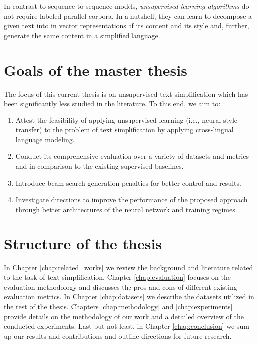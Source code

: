 In contrast to sequence-to-sequence models, \emph{unsupervised learning algorithms} do not require labeled parallel corpora. In a nutshell, they can learn to decompose a given text into in vector representations of its content and its style and, further, generate the same content in a simplified language.

\section{Goals of the master thesis}

The focus of this current thesis is on unsupervised text simplification which has been significantly less studied in the literature. To this end, we aim to: 
\begin{enumerate}
  \item Attest the feasibility of applying unsupervised learning (i.e., neural style transfer) to the problem of text simplification by applying cross-lingual language modeling.
  \item Conduct its comprehensive evaluation over a variety of datasets and metrics and in comparison to the existing supervised baselines.
  \item Introduce beam search generation penalties for better control and results.
  \item Investigate directions to improve the performance of the proposed approach through better architectures of the neural network and training regimes.
\end{enumerate}

\section{Structure of the thesis}

In Chapter \ref{chap:related_works} we review the background and literature related to the task of text simplification. Chapter \ref{chap:evaluation} focuses on the evaluation methodology and discusses the pros and cons of different existing evaluation metrics. In Chapter \ref{chap:datasets} we describe the datasets utilized in the rest of the thesis. Chapters \ref{chap:methodology} and \ref{chap:experiments} provide details on the methodology of our work and a detailed overview of the conducted experiments. Last but not least, in Chapter \ref{chap:conclusion} we sum up our results and contributions and outline directions for future research.  
\endinput